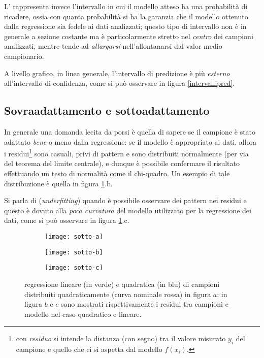 		L' rappresenta invece l'intervallo in cui il modello atteso ha una probabilità di ricadere, ossia con quanta probabilità si ha la garanzia che il modello ottenuto dalla regressione sia fedele ai dati analizzati; questo tipo di intervallo non è in generale a sezione costante ma è particolarmente stretto nel \textit{centro} dei campioni analizzati, mentre tende ad \textit{allargarsi} nell'allontanarsi dal valor medio campionario.
		
		
		A livello grafico, in linea generale, l'intervallo di predizione è più \textit{esterno} all'intervallo di confidenza, come si può osservare in figura \ref{intervallipred}.
		
	\subsection{Sovraadattamento e sottoadattamento}
		In generale una domanda lecita da porsi è quella di sapere se il campione è stato adattato \textit{bene} o meno dalla regressione: se il modello è appropriato ai dati, allora i residui\footnote{con \textit{residuo} si intende la distanza (con segno) tra il valore misurato $y_i$ del campione e quello che ci si aspetta dal modello $f(x_i)$.} sono casuali, privi di pattern e sono distribuiti normalmente (per via del teorema del limite centrale), e dunque è possibile confermare il risultato effettuando un testo di normalità come il chi-quadro. Un esempio di tale distribuzione è quella in figura \ref{fig:stat:sottoadattamento}.b.
		
		Si parla di  (\textit{underfitting}) quando è possibile osservare dei pattern nei residui e questo è dovuto alla \textit{poca curvatura} del modello utilizzato per la regressione dei dati, come si può osservare in figura \ref{fig:stat:sottoadattamento}.c.
		
		\begin{figure}[bht]
			\centering
			\begin{subfigure}{0.32\linewidth}
				\centering
				\texttt{[image: sotto-a]} \caption{}
			\end{subfigure}
			\begin{subfigure}{0.32\linewidth}
				\centering
				\texttt{[image: sotto-b]} \caption{}
			\end{subfigure}
			\begin{subfigure}{0.32\linewidth}
				\centering
				\texttt{[image: sotto-c]} \caption{}
			\end{subfigure}
			\caption{regressione lineare (in verde) e quadratica (in blu) di campioni distribuiti quadraticamente (curva nominale rossa) in figura $a$; in figura $b$ e $c$ sono mostrati rispettivamente i residui tra campioni e modello nel caso quadratico e lineare.}
			\label{fig:stat:sottoadattamento}
		\end{figure}
	
